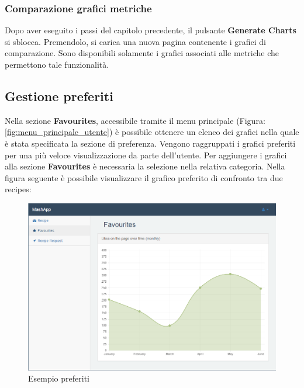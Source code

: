 		\subsubsection{Comparazione grafici metriche} %
		\label{sec:comparazione_grafici_metriche}
			Dopo aver eseguito i passi del capitolo precedente, il pulsante \textbf{Generate Charts} si sblocca. Premendolo, si carica una nuova pagina contenente i grafici di comparazione.\newline
			Sono disponibili solamente i grafici associati alle metriche che permettono tale funzionalità.



	\pagebreak
	\subsection{Gestione preferiti} %
	\label{sec:gestione_preferiti}
		Nella sezione \textbf{Favourites}, accessibile tramite il menu principale (Figura: \ref{fig:menu_principale_utente}) è possibile ottenere un elenco dei grafici nella quale è stata specificata la sezione di preferenza. Vengono raggruppati i grafici preferiti per una più veloce visualizzazione da parte dell'utente.\newline
		Per aggiungere i grafici alla sezione \textbf{Favourites} è necessaria la selezione nella relativa categoria.\newline
		Nella figura seguente è possibile visualizzare il grafico preferito di confronto tra due recipes:
		\begin{figure}[H]
			\centering
			\centerline{\includegraphics[width=14cm]{images/esempio_preferiti.png}}
			\caption{Esempio preferiti}
			\label{fig:esempio_preferiti}
		\end{figure}


